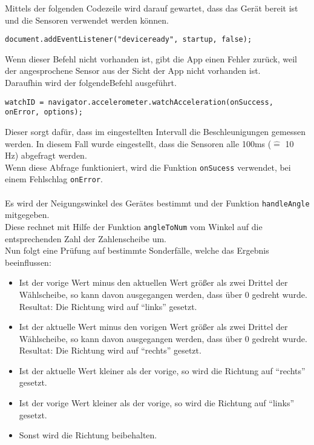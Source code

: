 Mittels der folgenden Codezeile wird darauf gewartet, dass das Gerät bereit ist und die Sensoren verwendet werden können.
\begin{lstlisting}
document.addEventListener("deviceready", startup, false);
\end{lstlisting}
Wenn dieser Befehl nicht vorhanden ist, gibt die App einen Fehler zurück, weil der angesprochene Sensor aus der Sicht der App nicht vorhanden ist.
\\
Daraufhin wird der folgendeBefehl ausgeführt.
\begin{lstlisting}
watchID = navigator.accelerometer.watchAcceleration(onSuccess,
onError, options);
\end{lstlisting}
Dieser sorgt dafür, dass im eingestellten Intervall die Beschleunigungen gemessen werden.
In diesem Fall wurde eingestellt, dass die Sensoren alle 100ms ($ \widehat{=} $ 10 Hz) abgefragt werden. \\
Wenn diese Abfrage funktioniert, wird die Funktion \texttt{onSucess} verwendet, bei einem Fehlschlag \texttt{onError}.
\\\\
Es wird der Neigungswinkel des Gerätes bestimmt und der Funktion \texttt{handleAngle} mitgegeben.\\
Diese rechnet mit Hilfe der Funktion \texttt{angleToNum} vom Winkel auf die entsprechenden Zahl der Zahlenscheibe um.\\
Nun folgt eine Prüfung auf bestimmte Sonderfälle, welche das Ergebnis beeinflussen:
\begin{itemize}
\item Ist der vorige Wert minus den aktuellen Wert größer als zwei Drittel der Wählscheibe, so kann davon ausgegangen werden, dass über 0 gedreht wurde.\\
Resultat: Die Richtung wird auf \enquote{links} gesetzt.
\item Ist der aktuelle Wert minus den vorigen Wert größer als zwei Drittel der Wählscheibe, so kann davon ausgegangen werden, dass über 0 gedreht wurde.\\
Resultat: Die Richtung wird auf \enquote{rechts} gesetzt.
\item Ist der aktuelle Wert kleiner als der vorige, so wird die Richtung auf \enquote{rechts} gesetzt.
\item Ist der vorige Wert kleiner als der vorige, so wird die Richtung auf \enquote{links} gesetzt.
\item Sonst wird die Richtung beibehalten.
\end{itemize}

